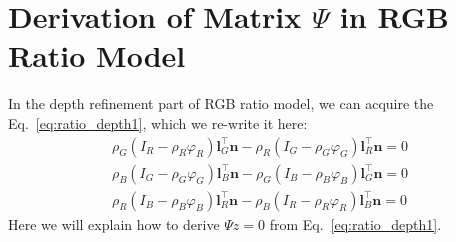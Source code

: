 

\chapter{Derivation of Matrix $\Psi$ in RGB Ratio Model}\label{appendix:implement}
In the depth refinement part of RGB ratio model, we can acquire the Eq.~\ref{eq:ratio_depth1}, which we re-write it here:
\begin{equation}\label{eq:appenx_origin}
\begin{split}
\rho_G (I_R - \rho_R \varphi_R)\mathbf{l}_G^\top \mathbf{n} - \rho_R (I_G - \rho_G \varphi_G)\mathbf{l}_R^\top\mathbf{n} = 0\\
\rho_B (I_G - \rho_G \varphi_G)\mathbf{l}_B^\top \mathbf{n} - \rho_G (I_B - \rho_B \varphi_B)\mathbf{l}_G^\top\mathbf{n} = 0\\
\rho_R (I_B - \rho_B \varphi_B)\mathbf{l}_R^\top \mathbf{n} - \rho_B (I_R - \rho_R \varphi_R)\mathbf{l}_B^\top\mathbf{n} = 0 
\end{split}
\end{equation}
Here we will explain how to derive $\Psi z = 0$ from Eq.~\ref{eq:ratio_depth1}.

